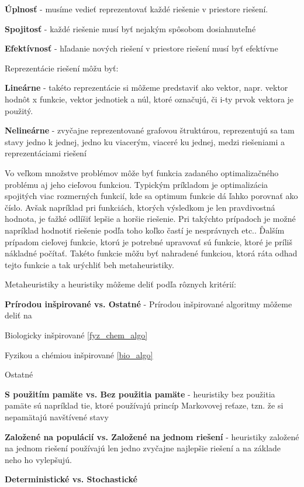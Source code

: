 \begin{my_itemize}
 \item \textbf{Úplnosť} - musíme vedieť reprezentovať každé riešenie v priestore riešení. 
 \item \textbf{Spojitosť} - každé riešenie musí byť nejakým spôsobom dosiahnuteľné
 \item \textbf{Efektívnosť} - hľadanie nových riešení v priestore riešení musí byť efektívne
\end{my_itemize}

Reprezentácie riešení môžu byť:

\begin{my_itemize}
 \item \textbf{Lineárne} - takéto reprezentácie si môžeme predstaviť ako vektor, napr. vektor hodnôt x funkcie, vektor jednotiek a núl, ktoré označujú, či i-ty prvok vektora je použitý.
 \item \textbf{Nelineárne} - zvyčajne reprezentované grafovou štruktúrou, reprezentujú sa tam stavy jedno k jednej, jedno ku viacerým, viaceré ku jednej, medzi riešeniami a reprezentáciami riešení
\end{my_itemize}

Vo veľkom množstve problémov môže byť funkcia zadaného optimalizačného problému aj jeho cieľovou funkciou. Typickým príkladom je optimalizácia spojitých viac rozmerných funkcií, kde sa optimum funkcie dá ľahko porovnať ako číslo. Avšak napríklad pri funkciách, ktorých výsledkom je len pravdivostná hodnota, je ťažké odlíšiť lepšie a horšie riešenie. Pri takýchto prípadoch je možné napríklad hodnotiť riešenie podľa toho koľko častí je nesprávnych etc.. Ďalším prípadom cieľovej funkcie, ktorú je potrebné upravovať sú funkcie, ktoré je príliš nákladné počítať. Takéto funkcie môžu byť nahradené funkciou, ktorá ráta odhad tejto funkcie a tak urýchliť beh metaheuristiky\cite{MetaMainBook}.

Metaheuristiky a heuristiky môžeme deliť\cite{ReviewNatureInspired} podľa rôznych kritérií:
\begin{my_itemize}
 \item
 {
    \textbf{Prírodou inšpirované vs. Ostatné} - Prírodou inšpirované algoritmy môžeme deliť na
    \begin{my_itemize}
     \item Biologicky inšpirované \ref{fyz_chem_algo}
     \item Fyzikou a chémiou inšpirované \ref{bio_algo}
     \item Ostatné
    \end{my_itemize} 
 }
 \item \textbf{S použitím pamäte vs. Bez použitia pamäte} - heuristiky bez použitia pamäte sú napríklad tie, ktoré používajú princíp Markovovej reťaze, tzn. že si nepamätajú navštívené stavy
 \item \textbf{Založené na populácií vs. Založené na jednom riešení} - heuristiky založené na jednom riešení používajú len jedno zvyčajne najlepšie riešení a na základe neho ho vylepšujú.
 
 \item \textbf{Deterministické vs. Stochastické}
\end{my_itemize}
\cite{MetahYang,MetaMainBook,MetahA}

